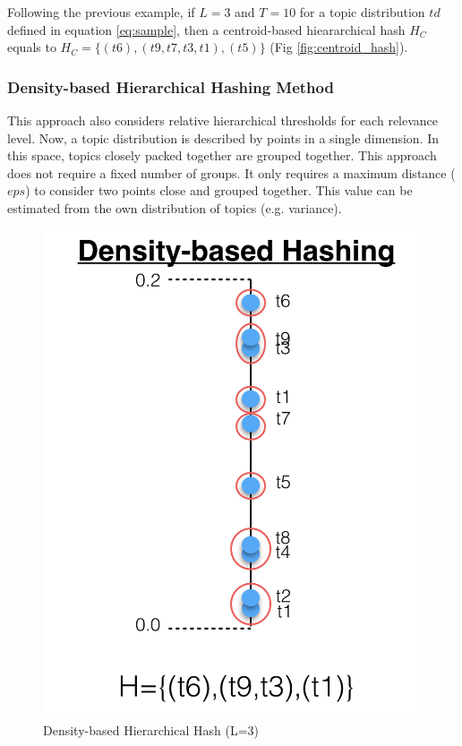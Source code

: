 Following the previous example, if $L=3$ and $T=10$ for a topic distribution $td$ defined in equation \ref{eq:sample}, then a centroid-based hieararchical hash $H_{C}$ equals to $H_{C}=\{(t6),(t9,t7,t3,t1),(t5)\}$ (Fig \ref{fig:centroid_hash}).


\subsubsection{Density-based Hierarchical Hashing Method}
\label{sec:comparison-density}
This approach also considers relative hierarchical thresholds for each relevance level. Now, a topic distribution is described by points in a single dimension. In this space, topics closely packed together are grouped together. This approach does not require a fixed number of groups. It only requires a maximum distance ($eps$) to consider two points close and grouped together. This value can be estimated from the own distribution of topics (e.g. variance).

\begin{figure}[t]\centering
\includegraphics[scale=0.35]{density-hash.png}
\caption{Density-based Hierarchical Hash (L=3)}
\label{fig:density_hash}
\end{figure}

